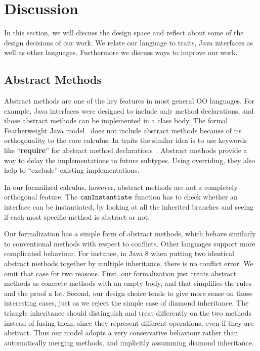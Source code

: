 \section{Discussion}\label{sec:discussion}
In this section, we will discuss the design space and reflect about some of the design decisions of our work. We relate 
our language to traits, Java interfaces as well as other languages. Furthermore we discuss
ways to improve our  work. 

\subsection{Abstract Methods}

Abstract methods are one of the key features in most general OO languages. For example, Java interfaces were designed
to include only method declarations, and those abstract methods can be implemented in a class body. 
The formal Featherweight Java model~\cite{Igarashi01FJ} does not include abstract methods because of its orthogonality
to the core calculus. In traits the
similar idea is to use keywords like ``\textbf{require}'' for abstract method declarations~\cite{scharli03traits}.
Abstract methods provide a way to
delay the implementations to future subtypes. Using overriding, they also help to ``exclude'' existing implementations.

In our formalized calculus, however, abstract methods are not a completely orthogonal feature. The $\texttt{canInstantiate}$ function
has to check whether an interface can be instantiated, by looking at all the inherited branches and seeing if each most specific method
is abstract or not.

Our formalization has a simple form of abstract methods, which behave similarly to conventional methods with respect to conflicts.
Other languages support more complicated behaviour.
For instance, in Java 8 when putting two identical abstract methods together by multiple inheritance, there is no conflict error. We omit
that case for two reasons. First, our formalization just treats abstract methods as concrete methods with an empty body, and that simplifies
the rules and the proof a lot. Second, our design choice tends to give more sense on those interesting cases, just as we reject the simple case of diamond inheritance. The triangle inheritance should distinguish and treat differently on the two methods instead of fusing them, since they represent different operations, even if they are abstract. Thus our model adopts a very conservative behaviour rather than automatically merging 
methods, and implicitly assumming diamond inheritance.

